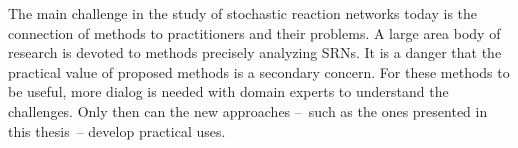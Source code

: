 \vspace{1em}
The main challenge in the study of stochastic reaction networks today is the connection of methods to practitioners and their problems.
A large area body of research is devoted to methods precisely analyzing \acp{SRN}.
It is a danger that the practical value of proposed methods is a secondary concern.
For these methods to be useful, more dialog is needed with domain experts to understand the challenges.
Only then can the new approaches --~such as the ones presented in this thesis~-- develop practical uses.
